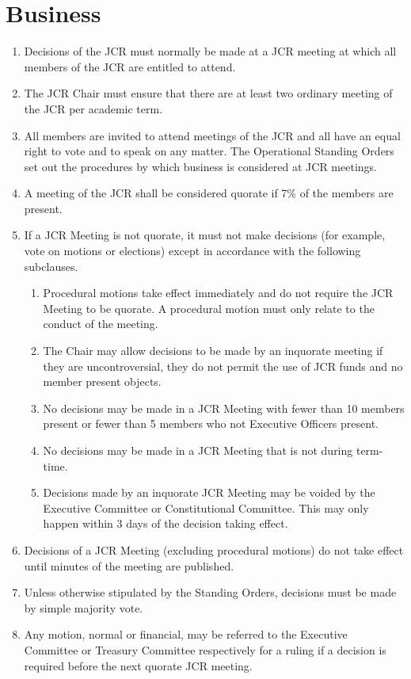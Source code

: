 \documentclass[12pt]{article}  %
\begin{document}
\section{Business}
\begin{enumerate}
    \item Decisions of the JCR must normally be made at a JCR meeting at which all members of the JCR are entitled to attend.
    \item The JCR Chair must ensure that there are at least two ordinary meeting of the JCR per academic term.
    \item All members are invited to attend meetings of the JCR and all have an equal right to vote and to speak on any matter. The Operational Standing Orders set out the procedures by which business is considered at JCR meetings.
    \item A meeting of the JCR shall be considered quorate if 7\% of the members are present.
    \item If a JCR Meeting is not quorate, it must not make decisions (for example, vote on motions or elections) except in accordance with the following subclauses.
    \begin{enumerate}
        \item Procedural motions take effect immediately and do not require the JCR Meeting to be quorate. A procedural motion must only relate to the conduct of the meeting.
        \item The Chair may allow decisions to be made by an inquorate meeting if they are uncontroversial, they do not permit the use of JCR funds and no member present objects.
        \item No decisions may be made in a JCR Meeting with fewer than 10 members present or fewer than 5 members who not Executive Officers present.
        \item No decisions may be made in a JCR Meeting that is not during term-time.
        \item Decisions made by an inquorate JCR Meeting may be voided by the Executive Committee or Constitutional Committee. This may only happen within 3 days of the decision taking effect.
    \end{enumerate}
    \item Decisions of a JCR Meeting (excluding procedural motions) do not take effect until minutes of the meeting are published.
    \item Unless otherwise stipulated by the Standing Orders, decisions must be made by simple majority vote.
    \item Any motion, normal or financial, may be referred to the Executive Committee or Treasury Committee respectively for a ruling if a decision is required before the next quorate JCR meeting.

\end{enumerate}
\end{document}
